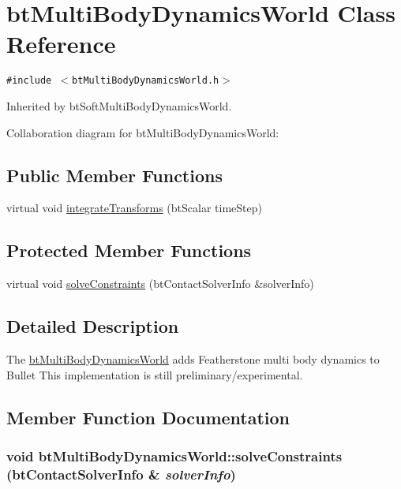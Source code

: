 \hypertarget{classbt_multi_body_dynamics_world}{
\section{btMultiBodyDynamicsWorld Class Reference}
\label{classbt_multi_body_dynamics_world}
}
{\tt \#include $<$btMultiBodyDynamicsWorld.h$>$}

Inherited by btSoftMultiBodyDynamicsWorld.

Collaboration diagram for btMultiBodyDynamicsWorld:\subsection*{Public Member Functions}
\begin{CompactItemize}
\item 
virtual void \hyperlink{classbt_multi_body_dynamics_world_6abe9896c6178b8d5bebdbca53fa7a74}{integrateTransforms} (btScalar timeStep)
\end{CompactItemize}
\subsection*{Protected Member Functions}
\begin{CompactItemize}
\item 
virtual void \hyperlink{classbt_multi_body_dynamics_world_96ca0256c11525090a831cc854fe0750}{solveConstraints} (btContactSolverInfo \&solverInfo)
\end{CompactItemize}


\subsection{Detailed Description}
The \hyperlink{classbt_multi_body_dynamics_world}{btMultiBodyDynamicsWorld} adds Featherstone multi body dynamics to Bullet This implementation is still preliminary/experimental. 

\subsection{Member Function Documentation}
\hypertarget{classbt_multi_body_dynamics_world_96ca0256c11525090a831cc854fe0750}{
\subsubsection[solveConstraints]{\setlength{\rightskip}{0pt plus 5cm}void btMultiBodyDynamicsWorld::solveConstraints (btContactSolverInfo \& {\em solverInfo})}}
\label{classbt_multi_body_dynamics_world_96ca0256c11525090a831cc854fe0750}




